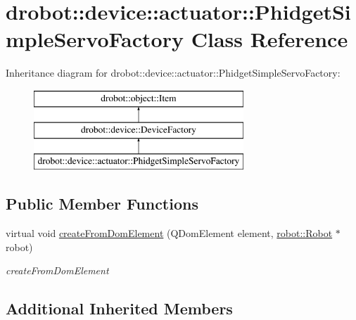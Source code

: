 \hypertarget{classdrobot_1_1device_1_1actuator_1_1PhidgetSimpleServoFactory}{\section{drobot\-:\-:device\-:\-:actuator\-:\-:Phidget\-Simple\-Servo\-Factory Class Reference}
\label{classdrobot_1_1device_1_1actuator_1_1PhidgetSimpleServoFactory}
}
Inheritance diagram for drobot\-:\-:device\-:\-:actuator\-:\-:Phidget\-Simple\-Servo\-Factory\-:\begin{figure}[H]
\begin{center}
\leavevmode
\includegraphics[height=3.000000cm]{classdrobot_1_1device_1_1actuator_1_1PhidgetSimpleServoFactory}
\end{center}
\end{figure}
\subsection*{Public Member Functions}
\begin{DoxyCompactItemize}
\item 
virtual void \hyperlink{classdrobot_1_1device_1_1actuator_1_1PhidgetSimpleServoFactory_a30cab321adc5079711b93fc452028736}{create\-From\-Dom\-Element} (Q\-Dom\-Element element, \hyperlink{classdrobot_1_1robot_1_1Robot}{robot\-::\-Robot} $\ast$robot)
\begin{DoxyCompactList}\small\item\em create\-From\-Dom\-Element \end{DoxyCompactList}\end{DoxyCompactItemize}
\subsection*{Additional Inherited Members}


